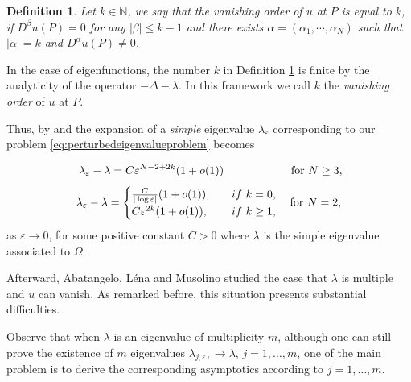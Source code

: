 \documentclass[11pt,reqno]{article}
\newtheorem{defi}[teo]{Definition}
\numberwithin{equation}{section}
\newcommand\N{\mathbb N}
\newcommand\e\varepsilon
\newcommand\la\lambda
\renewcommand\O\Omega
\begin{document}
\begin{defi}\label{defvanishing}
        Let $k\in\N$, we say that  the vanishing order of $u$  at $P$ is equal to $k$, if $D^\beta u(P)=0$ for any $|\beta|\leq k-1$ and  there exists  $ \alpha=(\alpha_1,\cdots,\alpha_N)$ such that $|\alpha|=k$ and $D^\alpha u(P)\neq 0$.
    \end{defi}
In the case of eigenfunctions, the number $k$ in Definition \ref{defvanishing} is finite by the analyticity of the operator $-\Delta - \lambda$. In this framework we call $k$ the \emph{vanishing order} of $u$ at $P$.

    
  Thus, by \cite[Theorem 1.14]{afhl} and \cite[Theorem 1.7]{alm2} the expansion of a {\em simple} eigenvalue $\lambda_\e$ corresponding to   our problem \eqref{eq:perturbedeigenvalueproblem} becomes
  
	\begin{equation}\label{eq:eigenvaluesbehavior}
	\ 	\lambda_\e - \lambda = C \e^{N-2+2k}(1+o(1)) \qquad\qquad\qquad{\hbox{for}\  N\ge 3},
	\end{equation}
    \begin{equation}\label{eq:N=2eigenvaluesbehavior}
      \lambda_\e - \lambda =
        \begin{cases}
            \frac{C}{|\log\e|}(1+o(1)), \quad& if\ k=0,\\
            C\e^{2k}(1+o(1)), & if\  k\ge 1,
        \end{cases}
       \quad {\hbox{for}\  N=2},
    \end{equation}
as $\e\to 0$, for some positive constant $C>0$ where $\la$ is the simple eigenvalue associated to $\O$.

Afterward, Abatangelo, L\'ena and Musolino \cite{alm1,alm2,alm2026} studied the case that $\lambda$ is multiple and $u$ can vanish. As remarked before, this situation presents substantial difficulties. 

Observe that when $\la$ is an eigenvalue of multiplicity $m$, although one can still prove the existence of $m$ eigenvalues $\la_{j,\e},\to\la$, $j=1,\ldots,m$, one of the main problem is to derive the corresponding asymptotics according to $j=1,\ldots,m$.
\end{document}

